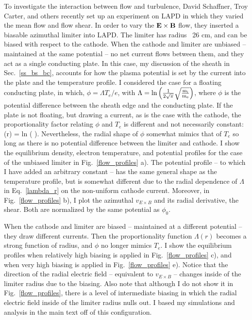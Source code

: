 To investigate the interaction between flow and turbulence, David Schaffner, Troy Carter, and others recently set up an experiment on LAPD
in which they varied the mean flow and flow shear. In order to vary the ${\bf E \times B}$ flow, they inserted a biasable azimuthal limiter into LAPD. The limiter has radius ~26 cm, and
can be biased with respect to the cathode. When the cathode and limiter are unbiased -- maintained at the same potential -- no net current flows between them, and they act
as a single conducting plate. In this case, my discussion of the sheath in Sec.~\ref{ss_bs_bc}, accounts for how the plasma potential is set by
the current into the plate and the temperature profile. I considered the case for a floating conducting plate, in which, $\phi = \Lambda T_e /e$, with 
$\Lambda = \rm{ln} \left( \frac{1}{2 \sqrt{\pi}} \sqrt{\frac{m_i}{m_e}}  \right)$, where $\phi$ is the potential difference between the sheath edge and the conducting plate. If the plate is not
floating, but drawing a current, as is the case with the cathode, the proportionality factor relating $\phi$ and $T_e$ is different and not necessarily constant:
\beq
\label{lambda_r}
\Lambda(r) = {\rm{ln}} \left(  \sqrt{\fmie}  \right).
\eeq
Nevertheless, the radial shape of $\phi$ somewhat mimics that of $T_e$ so long as there is no potential difference between the limiter and cathode. 
I show the equilibrium density, electron temperature, and potential profiles
for the case of the unbiased limiter in Fig.~\ref{flow_profiles} a). The potential profile -- to which I have added an arbitrary constant -- has the same general shape as the temperature profile,
but is somewhat different due to the radial dependence of $\Lambda$ in Eq.~\ref{lambda_r} on the non-uniform cathode current.
Moreover, in Fig.~\ref{flow_profiles} b), I plot the azimuthal $v_{E \times B}$ and its radial derivative, the shear. Both are normalized by the same potential as $\phi_0$.

When the cathode and limiter are biased -- maintained at a different potential -- they draw different currents. 
Then the proportionality function $\Lambda(r)$ becomes a strong function of radius, and $\phi$ no longer mimics $T_e$. 
I show the equilibrium profiles when relatively
high biasing is applied in Fig.~\ref{flow_profiles} c), and when very high biasing is applied in Fig.~\ref{flow_profiles} e). Notice that the direction of the radial electric field -- equivalent
to $v_{E \times B}$ -- changes inside of the limiter radius due to the biasing. Also note that although I do not show it in Fig.~\ref{flow_profiles}, there is a level of intermediate
biasing in which the radial electric field inside of the limiter radius nulls out. I based my simulations and analysis in the main text off of this configuration.

